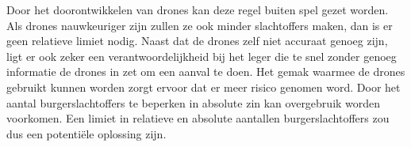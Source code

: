 Door het doorontwikkelen van drones kan deze regel buiten spel gezet worden. Als drones nauwkeuriger zijn zullen ze ook minder slachtoffers maken, dan is er geen relatieve limiet nodig. Naast dat de drones zelf niet accuraat genoeg zijn, ligt er ook zeker een verantwoordelijkheid bij het leger die te snel zonder genoeg informatie de drones in zet om een aanval te doen. Het gemak waarmee de drones gebruikt kunnen worden zorgt ervoor dat er meer risico genomen word. Door het aantal burgerslachtoffers te beperken in absolute zin kan overgebruik worden voorkomen. Een limiet in relatieve en absolute aantallen burgerslachtoffers zou dus een potenti\"ele oplossing zijn.